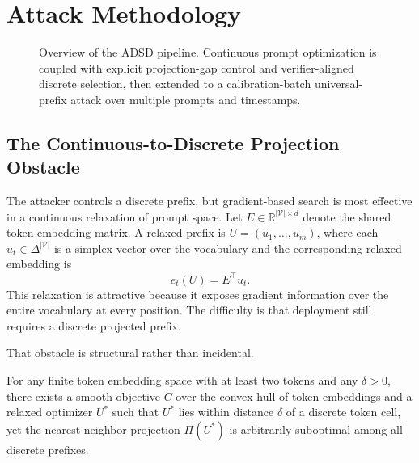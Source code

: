 \section{Attack Methodology}
\label{sec:method}

\begin{figure}[t]
\centering
{}
\caption{Overview of the ADSD pipeline. Continuous prompt optimization is
coupled with explicit projection-gap control and verifier-aligned discrete
selection, then extended to a calibration-batch universal-prefix attack over
multiple prompts and timestamps.}
\label{fig:adsd-pipeline}
\end{figure}

\subsection{The Continuous-to-Discrete Projection Obstacle}

The attacker controls a discrete prefix, but gradient-based search is most
effective in a continuous relaxation of prompt space. Let
$E \in \mathbb{R}^{|\mathcal{V}| \times d}$ denote the shared token embedding
matrix. A relaxed prefix is
$U = (u_1, \dots, u_m)$, where each $u_t \in \Delta^{|\mathcal{V}|}$ is a
simplex vector over the vocabulary and the corresponding relaxed embedding is
\[
e_t(U) = E^\top u_t.
\]
This relaxation is attractive because it exposes gradient information over the
entire vocabulary at every position. The difficulty is that deployment still
requires a discrete projected prefix.

That obstacle is structural rather than incidental.

\begin{proposition}
\label{prop:waywardness}
For any finite token embedding space with at least two tokens and any
$\delta > 0$, there exists a smooth objective $C$ over the convex hull of token
embeddings and a relaxed optimizer $U^*$ such that $U^*$ lies within distance
$\delta$ of a discrete token cell, yet the nearest-neighbor projection
$\Pi(U^*)$ is arbitrarily suboptimal among all discrete prefixes.
\end{proposition}

